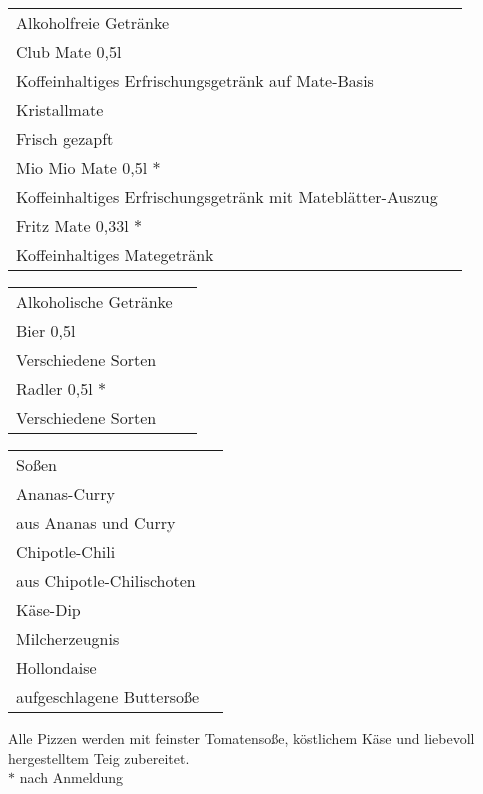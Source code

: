 \documentclass[12pt]{article}
\makeatletter
\newcommand*\ColText[1]{\textcolor{Goldenrod3}{#1}}
\newenvironment{Group}[1]
  {\noindent\begin{tabular*}{\textwidth}{@{}p{\linewidth}@{\extracolsep{\fill}}r@{}}
    {\fontsize{24}{29}\selectfont\ColText{#1}}\\[0.8em]}
  {\end{tabular*}}
\newcommand*\Entry[2]{%
  \sffamily#1 & #2}
\newcommand*\Expl[1]{%
  \hspace*{1em}\footnotesize #1}
\newcommand*\Footer[0]{%
\vfill
\noindent \small Alle Pizzen werden mit feinster Tomatensoße, köstlichem Käse und liebe\-voll hergestelltem  Teig zubereitet.\\
$\ast$ nach Anmeldung}
\makeatother
\begin{document}
\vspace{1em}

\begin{Group}{Alkoholfreie Getränke}
\Entry{Club Mate 0,5l}{} \\
\Expl{Koffeinhaltiges Erfrischungsgetränk auf Mate-Basis} \\
\Entry{Kristallmate}{} \\
\Expl{Frisch gezapft} \\
\Entry{Mio Mio Mate 0,5l $\ast$}{} \\
\Expl{Koffeinhaltiges Erfrischungsgetränk mit Mateblätter-Auszug} \\
\Entry{Fritz Mate 0,33l $\ast$}{} \\
\Expl{Koffeinhaltiges Mategetränk} \\
\end{Group}

\vspace{3em}

\begin{Group}{Alkoholische Getränke}
\Entry{Bier 0,5l}{} \\
\Expl{Verschiedene Sorten} \\
\Entry{Radler 0,5l $\ast$}{} \\
\Expl{Verschiedene Sorten} \\
\end{Group}

\vspace{3em}

\begin{Group}{Soßen}
	\Entry{Ananas-Curry}{} \\
	\Expl{aus Ananas und Curry} \\
	\Entry{Chipotle-Chili}{} \\
	\Expl{aus Chipotle-Chilischoten} \\
	\Entry{Käse-Dip} \\
	\Expl{Milcherzeugnis} \\
	\Entry{Hollondaise} \\
	\Expl{aufgeschlagene Buttersoße} \\
\end{Group}

\Footer
\end{document}
